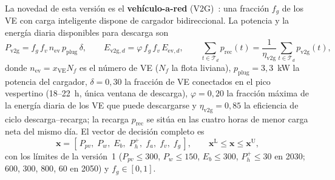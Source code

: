 \documentclass[11pt,a4paper]{article}
\newcommand{\vect}[1]{\bm{#1}}
\begin{document}
La novedad de esta versi\'on es el \textbf{veh\'iculo-a-red} (V2G)~\cite{kempton2005}:
una fracci\'on $f_g$ de los VE con carga inteligente dispone de cargador bidireccional. La
potencia y la energ\'ia diaria disponibles para descarga son
\begin{equation}
P_{\mathrm{v2g}} = f_g\,f_v\,n_{\mathrm{ev}}\,p_{\mathrm{plug}}\,\delta, \qquad
E_{\mathrm{v2g},d} = \varphi\,f_g\,f_v\,E_{\mathrm{ev},d}, \qquad
\sum_{t\in\mathcal{T}_d} p_{\mathrm{rec}}(t) = \frac{1}{\eta_{\mathrm{v2g}}}\sum_{t\in\mathcal{T}_d} p_{\mathrm{v2g}}(t),
\label{eq:v2g}
\end{equation}
donde $n_{\mathrm{ev}}=x_{\mathrm{VE}}N_f$ es el n\'umero de VE ($N_f$ la flota liviana),
$p_{\mathrm{plug}}=3{,}3$~kW la potencia del cargador, $\delta=0{,}30$ la fracci\'on de VE
conectados en el pico vespertino (18--22~h, \'unica ventana de descarga),
$\varphi=0{,}20$ la fracci\'on m\'axima de la energ\'ia diaria de los VE que puede
descargarse y $\eta_{\mathrm{v2g}}=0{,}85$ la eficiencia de ciclo descarga--recarga; la
recarga $p_{\mathrm{rec}}$ se sit\'ua en las cuatro horas de menor carga neta del mismo
d\'ia. El vector de decisi\'on completo es
\begin{equation}
\vect{x} = [\,P_{pv},\; P_{w},\; E_{b},\; P_{h}^{+},\; f_a,\; f_v,\; f_g\,],\qquad
\vect{x}^{\mathrm{L}}\le\vect{x}\le\vect{x}^{\mathrm{U}},
\label{eq:x}
\end{equation}
con los l\'imites de la versi\'on~1 ($P_{pv}\le300$, $P_w\le150$, $E_b\le300$,
$P_h^{+}\le30$ en 2030; $600$, $300$, $800$, $60$ en 2050) y $f_g\in[0,1]$.
\end{document}
